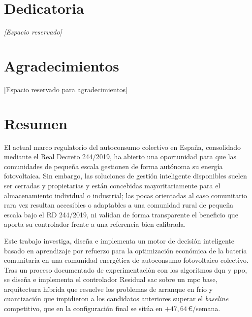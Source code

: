 \documentclass[12pt, a4paper, twoside]{report}
\begin{document}



\setcounter{page}{1}

\chapter*{Dedicatoria}
\thispagestyle{plain}
\vspace*{4cm}
\begin{flushright}\textit{[Espacio reservado]}\end{flushright}

\chapter*{Agradecimientos}
\thispagestyle{plain}
[Espacio reservado para agradecimientos]

\chapter*{Resumen}
\thispagestyle{plain}

El actual marco regulatorio del autoconsumo colectivo en España, consolidado
mediante el Real Decreto 244/2019, ha abierto una oportunidad para que las
comunidades de pequeña escala gestionen de forma autónoma su energía
fotovoltaica. Sin embargo, las soluciones de gestión inteligente disponibles
suelen ser cerradas y propietarias y están concebidas mayoritariamente para el
almacenamiento individual o industrial; las pocas orientadas al caso comunitario
rara vez resultan accesibles o adaptables a una comunidad rural de pequeña
escala bajo el RD 244/2019, ni validan de forma transparente el beneficio que
aporta su controlador frente a una referencia bien calibrada.

Este trabajo investiga, diseña e implementa un motor de decisión inteligente
basado en aprendizaje por refuerzo para la optimización económica de la batería
comunitaria en una comunidad energética de autoconsumo fotovoltaico colectivo.
Tras un proceso documentado de experimentación con los algoritmos \acrshort{dqn}
y \acrshort{ppo}, se diseña e implementa el controlador Residual \acrshort{sac}
sobre un \acrshort{mpc} base, arquitectura híbrida que resuelve los problemas de
arranque en frío y cuantización que impidieron a los candidatos anteriores
superar el \textit{baseline} competitivo, que en la configuración final se
sitúa en $+47{,}64$\,€/semana.
\end{document}
